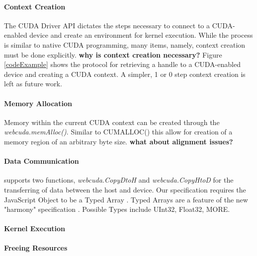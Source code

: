 \paragraph{Context Creation} The CUDA Driver API dictates the steps necessary to connect to a CUDA-enabled
device and create an environment for kernel execution. While the process is
similar to native CUDA programming, many items, namely, context creation must be
done explicitly. {\bf why is context creation necessary?}
Figure \ref{codeExample} shows the protocol for retrieving a handle to a
CUDA-enabled device and creating a CUDA context. A simpler, 1 or 0 step context
creation is left as future work.

\paragraph{Memory Allocation} Memory within the current CUDA context can be
created through the \textit{webcuda.memAlloc()}. Similar to CUMALLOC() this
allow for creation of a memory region of an arbitrary byte size. {\bf what about %
alignment issues?}

\paragraph{Data Communication} \name supports two functions,
\textit{webcuda.CopyDtoH} and \textit{webcuda.CopyHtoD} for the transferring of data
between the host and device. Our specification requires the JavaScript Object
to be a Typed Array \cite{typearray}. Typed Arrays are a feature of the new "harmony"
specification \cite{harmony}. Possible Types include UInt32, Float32, MORE.

\paragraph{Kernel Execution}

\paragraph{Freeing Resources}

